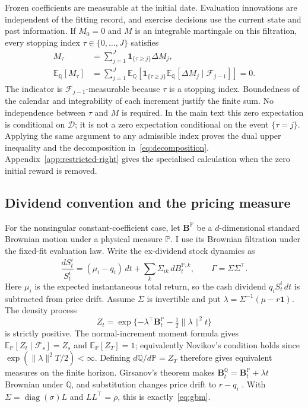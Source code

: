 \documentclass[11pt]{article}
\newcommand{\E}{\mathbb E}
\newcommand{\Q}{\mathbb Q}
\newcommand{\F}{\mathcal F}
\begin{document}
Frozen coefficients are measurable at the initial date. Evaluation innovations are independent of the fitting record, and exercise decisions use the current state and past information. If $M_0=0$ and $M$ is an integrable martingale on this filtration, every stopping index $\tau\in\{0,\ldots,J\}$ satisfies
\begin{equation}
\begin{aligned}
 M_\tau&=\sum_{j=1}^J\mathbf1_{\{\tau\geq j\}}\Delta M_j,\\
 \E_\Q[M_\tau]
 &=\sum_{j=1}^J\E_\Q\!\left[
 \mathbf1_{\{\tau\geq j\}}
 \E_\Q[\Delta M_j\mid\F_{j-1}]\right]=0.
\end{aligned}
\label{eq:foundation-optional-sampling}
\end{equation}
The indicator is $\F_{j-1}$-measurable because $\tau$ is a stopping index. Boundedness of the calendar and integrability of each increment justify the finite sum. No independence between $\tau$ and $M$ is required. In the main text this zero expectation is conditional on $\mathcal D$; it is not a zero expectation conditional on the event $\{\tau=j\}$. Applying the same argument to any admissible index proves the dual upper inequality and the decomposition in~\eqref{eq:decomposition}. Appendix~\ref{app:restricted-right} gives the specialised calculation when the zero initial reward is removed.

\subsection{Dividend convention and the pricing measure}

For the nonsingular constant-coefficient case, let $\mathbf B^{\mathbb P}$ be a $d$-dimensional standard Brownian motion under a physical measure $\mathbb P$. I use its Brownian filtration under the fixed-fit evaluation law. Write the ex-dividend stock dynamics as
\begin{equation}
 \frac{dS^i_t}{S^i_t}
 =(\mu_i-q_i)\,dt+\sum_k\Sigma_{ik}\,dB^{\mathbb P,k}_t,
 \qquad \Gamma=\Sigma\Sigma^\top.
\label{eq:foundation-physical-model}
\end{equation}
Here $\mu_i$ is the expected instantaneous total return, so the cash dividend $q_iS^i_t\,dt$ is subtracted from price drift. Assume $\Sigma$ is invertible and put $\lambda=\Sigma^{-1}(\mu-r\mathbf1)$. The density process
\begin{equation}
 Z_t=\exp\{-\lambda^\top\mathbf B^{\mathbb P}_t
               -\tfrac12\|\lambda\|^2t\}
\label{eq:foundation-density}
\end{equation}
is strictly positive. The normal-increment moment formula gives $\E_{\mathbb P}[Z_t\mid\F_s]=Z_s$ and $\E_{\mathbb P}[Z_T]=1$; equivalently Novikov's condition holds since $\exp(\|\lambda\|^2T/2)<\infty$. Defining $d\Q/d\mathbb P=Z_T$ therefore gives equivalent measures on the finite horizon. Girsanov's theorem makes $\mathbf B^\Q_t=\mathbf B^{\mathbb P}_t+\lambda t$ Brownian under $\Q$, and substitution changes price drift to $r-q_i$ \citep{shreve2004}. With $\Sigma=\operatorname{diag}(\sigma)L$ and $LL^\top=\rho$, this is exactly~\eqref{eq:gbm}.
\end{document}
